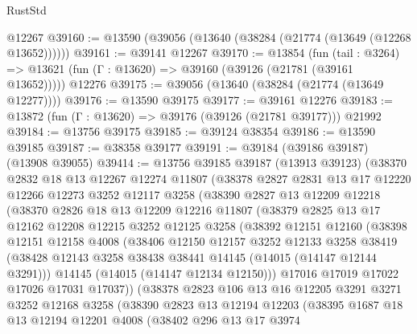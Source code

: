 \begin{lexlean}{RustStd}
\begin{coremodule}
    @12267
@39160 := @13590 (@39056 (@13640 (@38284 (@21774 (@13649 (@12268 @13652))))))
@39161 := @39141 @12267
@39170 := @13854
    (fun (tail : @3264) => @13621 (fun (Γ : @13620) => @39160 (@39126 (@21781 (@39161 @13652)))))
    @12276
@39175 := @39056 (@13640 (@38284 (@21774 (@13649 @12277))))
@39176 := @13590 @39175
@39177 := @39161 @12276
@39183 := @13872 (fun (Γ : @13620) => @39176 (@39126 (@21781 @39177))) @21992
@39184 := @13756 @39175
@39185 := @39124 @38354
@39186 := @13590 @39185
@39187 := @38358 @39177
@39191 := @39184 (@39186 @39187) (@13908 @39055)
@39414 := @13756
    @39185
    @39187
    (@13913 @39123)
    (@38370
      @2832
      @18
      @13
      @12267
      @12274
      @11807
      (@38378
        @2827
        @2831
        @13
        @17
        @12220
        @12266
        @12273
        @3252
        @12117
        @3258
        (@38390
          @2827
          @13
          @12209
          @12218
          (@38370
            @2826
            @18
            @13
            @12209
            @12216
            @11807
            (@38379
              @2825
              @13
              @17
              @12162
              @12208
              @12215
              @3252
              @12125
              @3258
              (@38392
                @12151
                @12160
                (@38398
                  @12151
                  @12158
                  @4008
                  (@38406
                    @12150
                    @12157
                    @3252
                    @12133
                    @3258
                    @38419
                    (@38428 @12143 @3258 @38438 @38441 @14145 (@14015 (@14147 @12144 @3291)))
                    @14145
                    (@14015 (@14147 @12134 @12150)))
                  @17016
                  @17019
                  @17022
                  @17026
                  @17031
                  @17037))
              (@38378
                @2823
                @106
                @13
                @16
                @12205
                @3291
                @3271
                @3252
                @12168
                @3258
                (@38390
                  @2823
                  @13
                  @12194
                  @12203
                  (@38395
                    @1687
                    @18
                    @13
                    @12194
                    @12201
                    @4008
                    (@38402
                      @296
                      @13
                      @17
                      @3974

\end{coremodule}
\end{lexlean}
